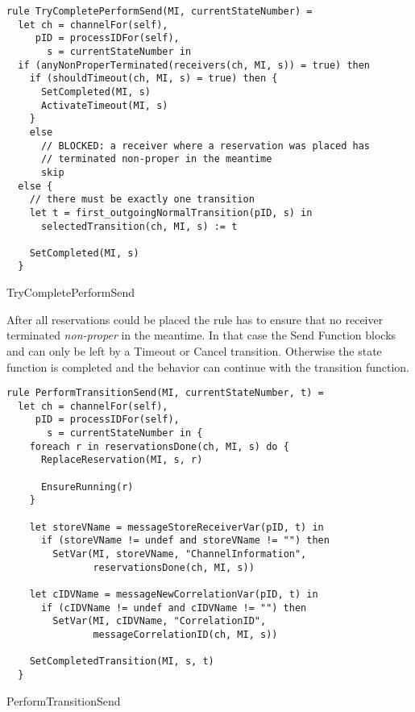 \begin{listing}[htbp]
\begin{verbatim}
rule TryCompletePerformSend(MI, currentStateNumber) =
  let ch = channelFor(self),
     pID = processIDFor(self),
       s = currentStateNumber in
  if (anyNonProperTerminated(receivers(ch, MI, s)) = true) then
    if (shouldTimeout(ch, MI, s) = true) then {
      SetCompleted(MI, s)
      ActivateTimeout(MI, s)
    }
    else
      // BLOCKED: a receiver where a reservation was placed has
      // terminated non-proper in the meantime
      skip
  else {
    // there must be exactly one transition
    let t = first_outgoingNormalTransition(pID, s) in
      selectedTransition(ch, MI, s) := t

    SetCompleted(MI, s)
  }
\end{verbatim}
\caption{TryCompletePerformSend}
\label{lst:shortasm:TryCompletePerformSend}
\end{listing}


After all reservations could be placed the 
rule has to ensure that no receiver terminated \textit{non-proper} in the
meantime. In that case the Send Function blocks and can only be left by a
Timeout or Cancel transition. Otherwise the state function is completed and the behavior can
continue with the transition function.


\begin{listing}[htbp]
\begin{verbatim}
rule PerformTransitionSend(MI, currentStateNumber, t) =
  let ch = channelFor(self),
     pID = processIDFor(self),
       s = currentStateNumber in {
    foreach r in reservationsDone(ch, MI, s) do {
      ReplaceReservation(MI, s, r)

      EnsureRunning(r)
    }

    let storeVName = messageStoreReceiverVar(pID, t) in
      if (storeVName != undef and storeVName != "") then
        SetVar(MI, storeVName, "ChannelInformation",
               reservationsDone(ch, MI, s))

    let cIDVName = messageNewCorrelationVar(pID, t) in
      if (cIDVName != undef and cIDVName != "") then
        SetVar(MI, cIDVName, "CorrelationID",
               messageCorrelationID(ch, MI, s))

    SetCompletedTransition(MI, s, t)
  }
\end{verbatim}
\caption{PerformTransitionSend}
\label{lst:shortasm:PerformTransitionSend}
\end{listing}


